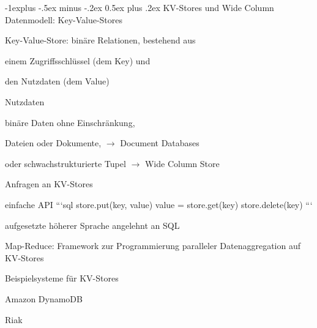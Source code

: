 \documentclass[a4paper]{article}
\makeatletter
\renewcommand{\subsection}{\@startsection{subsection}{2}{0mm}%
                                {-1explus -.5ex minus -.2ex}%
                                {0.5ex plus .2ex}%
                                {\normalfont\normalsize\bfseries}}
\makeatother
\begin{document}
\begin{multicols}{3}
\begin{itemize*}
        \subsection{KV-Stores und Wide Column}
        Datenmodell: Key-Value-Stores
        \begin{itemize*}
            \item Key-Value-Store: binäre Relationen, bestehend aus
            \begin{itemize*}
                \item einem Zugriffsschlüssel (dem Key) und
                \item den Nutzdaten (dem Value)
            \end{itemize*}
            \item Nutzdaten
            \begin{itemize*}
                \item binäre Daten ohne Einschränkung,
                \item Dateien oder Dokumente, $\rightarrow$ Document Databases
                \item oder schwachstrukturierte Tupel $\rightarrow$ Wide Column Store
            \end{itemize*}
            \item Anfragen an KV-Stores
            \begin{itemize*}
                \item einfache API
                ```sql
                store.put(key, value)
                value = store.get(key)
                store.delete(key)
                ```
                \item aufgesetzte höherer Sprache angelehnt an SQL
                \item Map-Reduce: Framework zur Programmierung paralleler Datenaggregation auf KV-Stores
            \end{itemize*}
            \item Beispielsysteme für KV-Stores
            \begin{itemize*}
                \item Amazon DynamoDB
                \item Riak
            \end{itemize*}
        \end{itemize*}


\end{itemize*}
\end{multicols}
\end{document}

